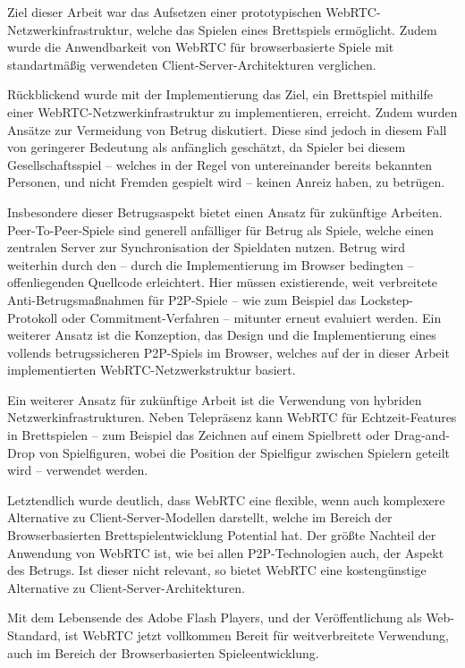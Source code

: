 Ziel dieser Arbeit war das Aufsetzen einer prototypischen WebRTC-Netzwerkinfrastruktur, welche das Spielen eines Brettspiels ermöglicht. Zudem wurde die Anwendbarkeit von \acs{WebRTC} für browserbasierte Spiele mit standartmäßig verwendeten Client-Server-Architekturen verglichen.\par

Rückblickend wurde mit der Implementierung das Ziel, ein Brettspiel mithilfe einer WebRTC-Netzwerkinfrastruktur zu implementieren, erreicht. Zudem wurden Ansätze zur Vermeidung von Betrug diskutiert. Diese sind jedoch in diesem Fall von geringerer Bedeutung als anfänglich geschätzt, da Spieler bei diesem Gesellschaftsspiel -- welches in der Regel von untereinander bereits bekannten Personen, und nicht Fremden gespielt wird -- keinen Anreiz haben, zu betrügen.\par

Insbesondere dieser Betrugsaspekt bietet einen Ansatz für zukünftige Arbeiten. Peer-To-Peer-Spiele sind generell anfälliger für Betrug als Spiele, welche einen zentralen Server zur Synchronisation der Spieldaten nutzen. Betrug wird weiterhin durch den -- durch die Implementierung im Browser bedingten -- offenliegenden Quellcode erleichtert. Hier müssen existierende, weit verbreitete Anti-Betrugsmaßnahmen für \acs{P2P}-Spiele -- wie zum Beispiel das Lockstep-Protokoll oder Commitment-Verfahren -- mitunter erneut evaluiert werden. Ein weiterer Ansatz ist die Konzeption, das Design und die Implementierung eines vollends betrugssicheren \acs{P2P}-Spiels im Browser, welches auf der in dieser Arbeit implementierten \acs{WebRTC}-Netzwerkstruktur basiert.\par

Ein weiterer Ansatz für zukünftige Arbeit ist die Verwendung von hybriden Netzwerkinfrastrukturen. Neben Telepräsenz kann WebRTC für Echtzeit-Features in Brettspielen -- zum Beispiel das Zeichnen auf einem Spielbrett oder Drag-and-Drop von Spielfiguren, wobei die Position der Spielfigur zwischen Spielern geteilt wird -- verwendet werden.\par

Letztendlich wurde deutlich, dass WebRTC eine flexible, wenn auch komplexere Alternative zu Client-Server-Modellen darstellt, welche im Bereich der Browserbasierten Brettspielentwicklung Potential hat. Der größte Nachteil der Anwendung von WebRTC ist, wie bei allen \acs{P2P}-Technologien auch, der Aspekt des Betrugs. Ist dieser nicht relevant, so bietet WebRTC eine kostengünstige Alternative zu Client-Server-Architekturen.\par

Mit dem Lebensende des Adobe Flash Players, und der Veröffentlichung als Web-Standard, ist WebRTC jetzt vollkommen Bereit für weitverbreitete Verwendung, auch im Bereich der Browserbasierten Spieleentwicklung.\par